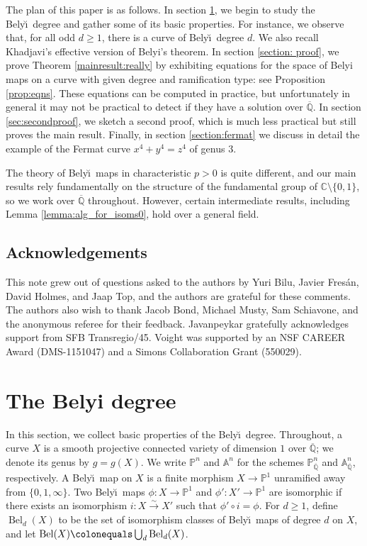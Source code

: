 \documentclass{amsproc}
\numberwithin{equation}{section}
\numberwithin{figure}{section}
\theoremstyle{definition}
\theoremstyle{remark}
\newcommand{\Qbar}{\overline{\mathbb{Q}}}
\newcommand{\p}{\mathbb{P}}
\DeclareMathOperator{\Bel}{Bel}
\renewcommand{\geq}{\geqslant}
\newcommand{\Belyi}{Bely\u{\i}}
\newcommand{\defi}[1]{\textsf{#1}} 	%
\begin{document}
The plan of this paper is as follows. In section \ref{section: Belyi degree}, we begin to study the \Belyi\ degree and gather some of its basic properties. For instance, we observe that, for all odd $d\geq 1$, there is a curve of \Belyi\ degree $d$. We also recall Khadjavi's effective version of Belyi's theorem.  In section \ref{section: proof}, we prove Theorem \ref{mainresult:really} by exhibiting equations for the space of Belyi maps on a curve with given degree and ramification type: see Proposition \ref{prop:eqns}.  These equations can be computed in practice, but unfortunately in general it may not be practical to detect if they have a solution over $\Qbar$.  In section \ref{sec:secondproof}, we sketch a second proof, which is much less practical but still proves the main result.  Finally, in section \ref{section:fermat} we discuss in detail the example of the Fermat curve $x^4+y^4=z^4$ of genus $3$.


The theory of \Belyi\ maps in characteristic $p>0$ is quite different,
and our main results rely fundamentally on the structure of the
fundamental group of $\mathbb{C}\setminus\{0,1\}$, so we work over
$\Qbar$ throughout.  However, certain intermediate results, including
Lemma \ref{lemma:alg_for_isoms0}, hold over a general field.


\subsection*{Acknowledgements} This note grew out of questions asked to the authors by Yuri Bilu, Javier Fres\'an,  David Holmes, and Jaap Top, and the authors are grateful for these comments.  The authors also wish to thank Jacob Bond, Michael Musty, Sam Schiavone, and the anonymous referee for their feedback.  Javanpeykar gratefully acknowledges support from SFB Transregio/45.  Voight was supported by an NSF CAREER Award (DMS-1151047) and a Simons Collaboration Grant (550029).


\section{The Belyi degree}\label{section: Belyi degree}

In this section, we collect basic properties of the \Belyi\ degree.  Throughout, a \defi{curve} $X$ is a smooth projective connected variety of dimension $1$ over $\Qbar$; we denote its genus by $g=g(X)$. We write $\p^n$ and $\mathbb A^n$ for the schemes $\p^n_{\Qbar}$ and $\mathbb A^n_{\Qbar}$, respectively.  A \defi{\Belyi\ map} on $X$ is a finite morphism $X \to \p^1$ unramified away from $\{0,1,\infty\}$.  Two \Belyi\ maps $\phi\colon X \to \p^1$ and $\phi'\colon X' \to \p^1$ are \defi{isomorphic} if there exists an isomorphism $i\colon X \xrightarrow{\sim} X'$ such that $\phi' \circ i = \phi$.
For $d \geq 1$, define $\Bel_d(X)$ to be the set of isomorphism classes of \Belyi\ maps of degree $d$ on $X$, and let $\Bel(X) \colonequals \bigcup_d \Bel_d(X)$.  
\end{document}
